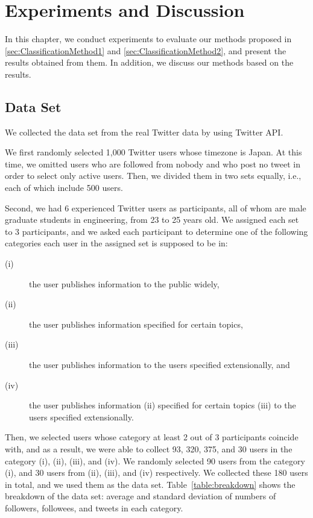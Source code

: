\section{Experiments and Discussion}
\label{sec:Experiment}

In this chapter, we conduct experiments to evaluate our methods proposed
in \ref{sec:ClassificationMethod1} and \ref{sec:ClassificationMethod2},
and present the results obtained from them.  In addition, we discuss our
methods based on the results.

\subsection{Data Set}
\label{subsec:Data Set}

We collected the data set from the real Twitter data by using Twitter
API.

We first randomly selected 1,000 Twitter users whose timezone is Japan.
At this time, we omitted users who are followed from nobody and who post
no tweet in order to select only active users.  Then, we divided them in
two sets equally, i.e., each of which include 500 users.

Second, we had 6 experienced Twitter users as participants, all of whom
are male graduate students in engineering, from 23 to 25 years old.  We
assigned each set to 3 participants, and we asked each participant to
determine one of the following categories each user in the assigned set
is supposed to be in:

\begin{description}
\item[(i)] the user publishes information to the public widely,
\item[(ii)] the user publishes information specified for certain topics,
\item[(iii)] the user publishes information to the users specified
           extensionally, and
\item[(iv)] the user publishes information (ii) specified for certain
           topics (iii) to the users specified extensionally.
\end{description}


Then, we selected users whose category at least 2 out of 3 participants
coincide with, and as a result, we were able to collect 93, 320, 375,
and 30 users in the category (i), (ii), (iii), and (iv).  We randomly
selected 90 users from the category (i), and 30 users from (ii), (iii),
and (iv) respectively.  We collected these 180 users in total, and we
used them as the data set.  Table~\ref{table:breakdown} shows the
breakdown of the data set: average and standard deviation of numbers of
followers, followees, and tweets in each category.

